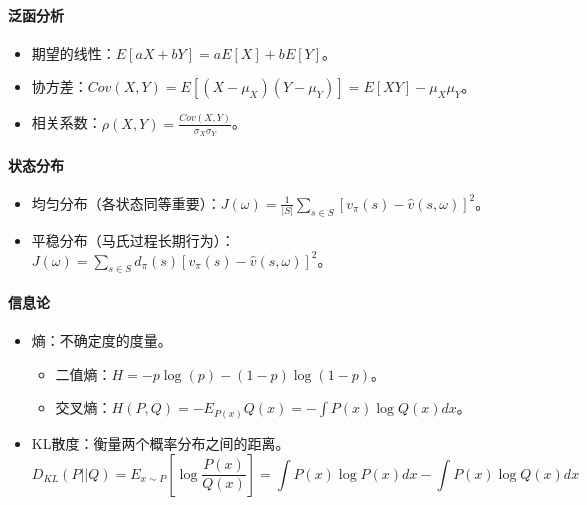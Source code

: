 \documentclass[
12pt, %
a4paper, 
oneside, %
]{scrartcl}
\begin{document}
{\paragraph{泛函分析}
\begin{itemize}
\item 期望的线性：$ E[aX + bY] = a E[X] + b E[Y] $。
\item 协方差：$ Cov(X, Y) = E[(X - \mu_X)(Y - \mu_Y)] = E[XY] - \mu_X \mu_Y $。
\item 相关系数：$ \rho(X, Y) = \frac{Cov(X, Y)}{\sigma_X \sigma_Y} $。
\end{itemize}
\paragraph{状态分布}
\begin{itemize}
\item 均匀分布（各状态同等重要）：$ J(\omega) = \frac{1}{|S|}\sum_{s \in S} [v_{\pi}(s) - \hat{v}(s, \omega)]^2 $。
\item 平稳分布（马氏过程长期行为）：$ J(\omega) = \sum_{s \in S} d_{\pi}(s)[v_{\pi}(s) - \hat{v}(s, \omega)]^2 $。
\end{itemize}
\paragraph{信息论}
\begin{itemize}
\item 熵：不确定度的度量。
\begin{itemize}
\item 二值熵：$ H = -p \log(p) - (1 - p)\log(1 - p) $。
\item 交叉熵：$ H(P, Q) = -E_{P(x)} Q(x) = -\int P(x) \log Q(x) dx $。
\end{itemize}
\item KL散度：衡量两个概率分布之间的距离。
$$ D_{KL}(P||Q) = E_{x \sim P}[\log \frac{P(x)}{Q(x)}] = \int P(x) \log P(x) dx - \int P(x) \log Q(x) dx $$
\end{itemize}
}
\end{document}
